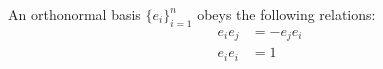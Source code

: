 \begin{corollary}\label{c:orthonormal-bases}
	An orthonormal basis $\{e_i\}_{i=1}^n$ obeys the following relations:
	\begin{align*}
		e_ie_j &= -e_je_i \\
		e_ie_i &= 1
	\end{align*}
\end{corollary}
